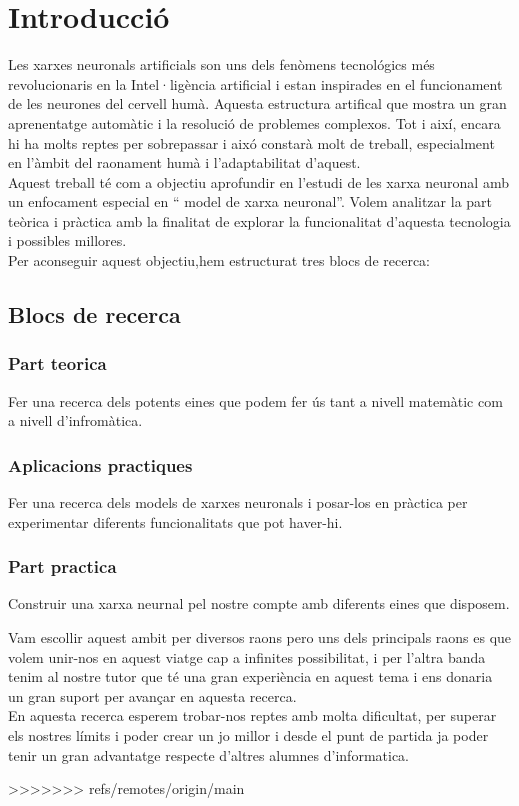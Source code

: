 \chapter{Introducció}
\label{c:intro}

Les xarxes neuronals artificials son uns dels fenòmens tecnológics més revolucionaris en la Intel·ligència artificial i estan inspirades en el funcionament de les neurones del cervell humà. Aquesta estructura artifical que mostra un gran aprenentatge automàtic i la resolució de problemes complexos. Tot i així, encara hi ha molts reptes per sobrepassar i aixó constarà molt de treball, especialment en l'àmbit del raonament humà i l'adaptabilitat d'aquest.\\
Aquest treball té com a objectiu aprofundir en l'estudi de les xarxa neuronal amb un enfocament especial en `` model de xarxa neuronal''. Volem analitzar la part teòrica i pràctica amb la finalitat de explorar la funcionalitat d'aquesta tecnologia i possibles millores.\\
Per aconseguir aquest objectiu,hem estructurat tres blocs de recerca:
\section{Blocs de recerca}
\subsection{Part teorica}
Fer una recerca dels potents eines que podem fer ús tant a nivell matemàtic com a nivell  d'infromàtica.
\subsection{Aplicacions practiques}
Fer una recerca dels models de xarxes neuronals i posar-los en pràctica per experimentar diferents funcionalitats que pot haver-hi.
\subsection{Part practica }
Construir una xarxa neurnal pel nostre compte amb diferents eines que disposem.

Vam escollir aquest ambit per diversos raons pero uns dels principals raons es que volem unir-nos en aquest viatge cap  a infinites possibilitat, i per l'altra banda tenim al nostre tutor que té una gran experiència en aquest tema i ens donaria un gran suport per avançar en aquesta recerca.\\
En aquesta recerca esperem trobar-nos reptes amb molta dificultat, per superar els nostres límits i poder crear un jo millor i desde el punt de partida ja poder tenir un gran advantatge respecte d'altres alumnes d'informatica.















>>>>>>> refs/remotes/origin/main
